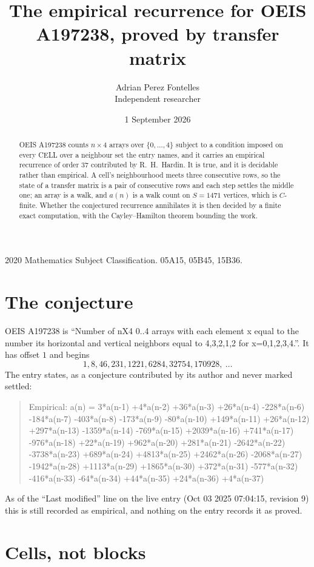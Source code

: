 \documentclass[11pt,a4paper]{article}
\title{The empirical recurrence for OEIS A197238, proved by transfer matrix}
\author{Adrian Perez Fontelles\\ \small Independent researcher}
\date{1 September 2026}
\theoremstyle{plain}
\theoremstyle{definition}
\begin{document}
\maketitle

\begin{abstract}
OEIS A197238 counts $n\times4$ arrays over $\{0,\dots,4\}$ subject to a condition imposed on
every CELL over a neighbour set the entry names, and it carries an empirical recurrence of
order $37$ contributed by R.~H.~Hardin. It is true, and it is decidable rather than
empirical. A cell's neighbourhood meets three consecutive rows, so the state of a transfer
matrix is a pair of consecutive rows and each step settles the middle one; an array is a
walk, and $a(n)$ is a walk count on $S=1471$ vertices, which is $C$-finite. Whether the
conjectured recurrence annihilates it is then decided by a finite exact computation, with the
Cayley--Hamilton theorem bounding the work.
\end{abstract}

\noindent\small 2020 Mathematics Subject Classification. 05A15, 05B45, 15B36.\normalsize

\section{The conjecture}

OEIS A197238 is ``Number of nX4 0..4 arrays with each element x equal to the number its horizontal and vertical neighbors equal to 4,3,2,1,2 for x=0,1,2,3,4.''. It has offset $1$ and begins
\[
1, 8, 46, 231, 1221, 6284, 32754, 170928,\ \dots
\]
The entry states, as a conjecture contributed by its author and never marked settled:
\begin{quote}
Empirical: a(n) = 3*a(n-1) +4*a(n-2) +36*a(n-3) +26*a(n-4) -228*a(n-6) -184*a(n-7) -403*a(n-8) -173*a(n-9) -80*a(n-10) +149*a(n-11) +26*a(n-12) +297*a(n-13) -1359*a(n-14) -769*a(n-15) +2039*a(n-16) +741*a(n-17) -976*a(n-18) +22*a(n-19) +962*a(n-20) +281*a(n-21) -2642*a(n-22) -3738*a(n-23) +689*a(n-24) +4813*a(n-25) +2462*a(n-26) -2068*a(n-27) -1942*a(n-28) +1113*a(n-29) +1865*a(n-30) +372*a(n-31) -577*a(n-32) -416*a(n-33) -64*a(n-34) +44*a(n-35) +24*a(n-36) +4*a(n-37)
\end{quote}
As of the ``Last modified'' line on the live entry (Oct 03 2025 07:04:15, revision 9) this is still
recorded as empirical, and nothing on the entry records it as proved.

\section{Cells, not blocks}
\end{document}
